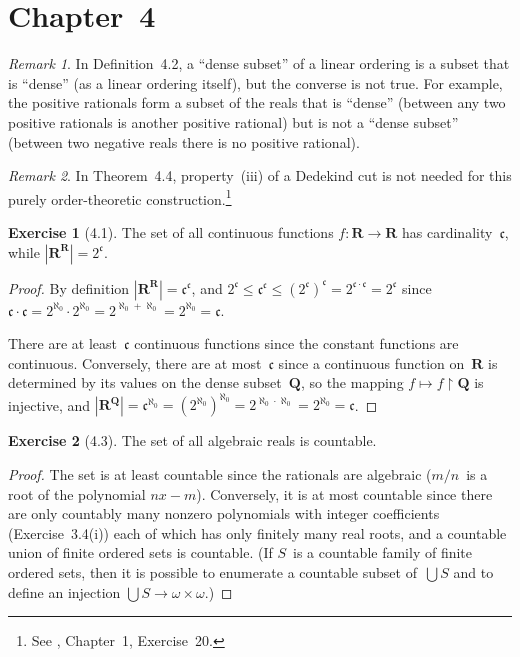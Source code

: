 \documentclass[letterpaper,12pt]{article}
\newcommand{\Q}{\boldsymbol{Q}}
\newcommand{\R}{\boldsymbol{R}}
\newcommand{\cc}{\mathfrak{c}}
\newcommand{\al}{\aleph}
\newcommand{\bigunion}{\bigcup}
\newcommand{\mult}{\cdot}
\newcommand{\card}[1]{|#1|}
\theoremstyle{definition}
\newtheorem*{exer}{Exercise}
\theoremstyle{remark}
\newtheorem*{rmk}{Remark}
\begin{document}
\section*{Chapter~4}
\begin{rmk}
In Definition~4.2, a ``dense subset'' of a linear ordering is a subset that is ``dense'' (as a linear ordering itself), but the converse is not true. For example, the positive rationals form a subset of the reals that is ``dense'' (between any two positive rationals is another positive rational) but is not a ``dense subset'' (between two negative reals there is no positive rational).
\end{rmk}

\begin{rmk}
In Theorem~4.4, property~(iii) of a Dedekind cut is not needed for this purely order-theoretic construction.\footnote{See \cite{rudin}, Chapter~1, Exercise~20.}
\end{rmk}

\begin{exer}[4.1]
The set of all continuous functions \(f:\R\to\R\) has cardinality~\(\cc\), while \(\card{\R^{\R}}=2^{\cc}\).
\end{exer}
\begin{proof}
By definition \(\card{\R^{\R}}=\cc^{\cc}\), and \(2^{\cc}\le\cc^{\cc}\le(2^{\cc})^{\cc}=2^{\cc\mult\cc}=2^{\cc}\) since \(\cc\mult\cc=2^{\al_0}\mult 2^{\al_0}=2^{\al_0+\al_0}=2^{\al_0}=\cc\).

There are at least~\(\cc\) continuous functions since the constant functions are continuous. Conversely, there are at most~\(\cc\) since a continuous function on~\(\R\) is determined by its values on the dense subset~\(\Q\), so the mapping \(f\mapsto f\restriction\Q\) is injective, and \(\card{\R^{\Q}}=\cc^{\al_0}=(2^{\al_0})^{\al_0}=2^{\al_0\mult\al_0}=2^{\al_0}=\cc\).
\end{proof}

\begin{exer}[4.3]
The set of all algebraic reals is countable.
\end{exer}
\begin{proof}
The set is at least countable since the rationals are algebraic (\(m/n\)~is a root of the polynomial \(nx-m\)). Conversely, it is at most countable since there are only countably many nonzero polynomials with integer coefficients (Exercise~3.4(i)) each of which has only finitely many real roots, and a countable union of finite ordered sets is countable. (If \(S\)~is a countable family of finite ordered sets, then it is possible to enumerate a countable subset of~\(\bigunion S\) and to define an injection \(\bigunion S\to\omega\times\omega\).)
\end{proof}
\end{document}
